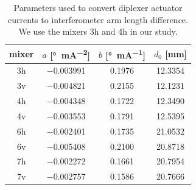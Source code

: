 \begin{table}
    \centering
    \begin{tabular}{cccc}
        \toprule
        mixer &
        $a$ [\si{\degree\per\milli\ampere\squared}]
        &
        $b$ [\si{\degree\per\milli\ampere}]
        &
        $d_0$ [\si{\milli\meter}]
        \\
        \midrule
        3h    &  \num{-0.003991} & 0.1976 & 12.3354\\
        3v    &  \num{-0.004821} & 0.2155 & 12.1231\\
        4h    &  \num{-0.004348} & 0.1722 & 12.3490\\
        4v    &  \num{-0.003553} & 0.1791 & 12.5395\\
        6h    &  \num{-0.002401} & 0.1735 & 21.0532\\
        6v    &  \num{-0.005408} & 0.2100 & 20.8718\\
        7h    &  \num{-0.002272} & 0.1661 & 20.7954\\
        7v    &  \num{-0.002757} & 0.1586 & 20.7666\\
        \bottomrule
    \end{tabular}
    \caption{Parameters used to convert diplexer actuator currents to interferometer arm length difference.
    We use the mixers 3h and 4h in our study.}
    \label{tab:diplexer_params}
\end{table}
